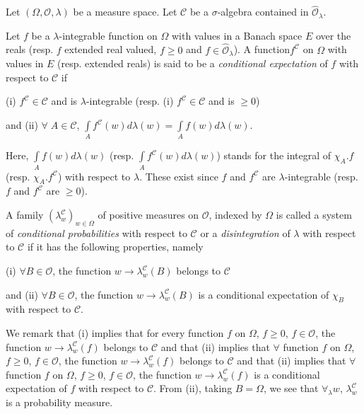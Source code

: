 Let $(\Omega, \mathscr{O}, \lambda)$ be a measure space. Let
$\mathscr{C}$ be a $\sigma$-algebra contained in
$\hat{\mathscr{O}}_\lambda$. 

\begin{defn}\label{part1:chap1:def1}%
Let $f$ be a $\lambda$-integrable function on $\Omega$ with values in
a Banach space $E$ over the reals (resp. $f$ extended real valued, $f
\geq 0$ and $f \in \hat{\mathscr{O}}_\lambda$). A
function\pageoriginale $f^\mathscr{C}$ on $\Omega$ with values in $E$
(resp. extended reals) is said to be a \textit{conditional
  expectation} of $f$ with respect to $\mathscr{C}$ if 

\noindent
(i) $f^\mathscr{C} \in \mathscr{C}$ and is $\lambda$-integrable
(resp. (i) $f^\mathscr{C} \in \mathscr{C}$ and is $ \geq 0$)

\noindent
and (ii) $\forall  \; A \in \mathscr{C}$, $\int\limits_A f^\mathscr{C}
(w) d\lambda (w) = \int\limits_A f(w) d \lambda (w) $. 
\end{defn}

Here, $\int\limits_A f(w) d \lambda (w)$ (resp. $\int\limits_A
f^\mathscr{C} (w) d \lambda (w)$) stands for the integral of
$\chi_A.f$ (resp. $\chi_A . f^\mathscr{C}$) with respect to
$\lambda$. These exist since $f$ and $f^\mathscr{C}$ are
$\lambda$-integrable (resp. $f$ and $f^\mathscr{C}$ are $\geq 0$). 


\begin{defn}\label{part1:chap1:def2}
A family $(\lambda^\mathscr{C}_w)_{w \in \Omega}$ of positive measures
on $\mathscr{O}$, indexed by $\Omega$ is called a system of
\textit{conditional probabilities} with respect to $\mathscr{C}$ or a
\textit{disintegration} of $\lambda$ with respect to $\mathscr{C}$ if
it has the following properties, namely 

\medskip
\noindent
(i) $\forall B \in\mathscr{O}$, the function $w \to
\lambda^\mathscr{C}_w (B)$ belongs to $\mathscr{C}$

\medskip
\noindent
and (ii) $\forall B \in \mathscr{O}$, the function $w \to
\lambda^\mathscr{C}_w (B)$ is a conditional expectation of $\chi_B$
with respect to $\mathscr{C}$. 
\end{defn}

We remark that (i) implies that for every function $f$ on $\Omega$, $f
\geq 0$, $f \in \mathscr{O}$, the function $w \to
\lambda^\mathscr{C}_w (f)$ belongs to $\mathscr{C}$ and that (ii)
implies that $\forall$ function $f$ on $\Omega$, $f \geq 0$, $f \in
\mathscr{O}$, the function $w \to \lambda^\mathscr{C}_w (f)$ belongs
to $\mathscr{C}$ and that (ii) implies that $\forall$ function $f$ on
$\Omega$, $f \geq 0$, $f \in \mathscr{O}$, the function $w \to
\lambda^\mathscr{C}_w (f)$ is a conditional expectation of $f$ with
respect to $\mathscr{C}$. From (ii), taking $B = \Omega$, we see that
$\forall_\lambda w$, $\lambda^\mathscr{C}_w$ is a probability
measure. 

